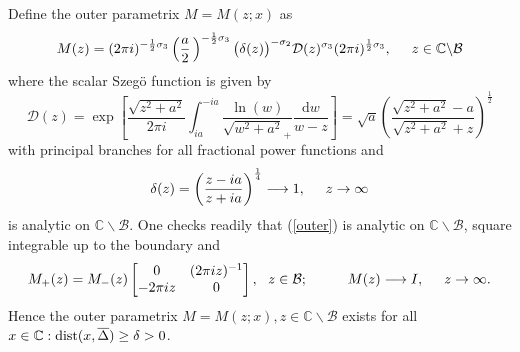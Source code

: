 \documentclass[10pt,oneside,reqno]{amsart}
\numberwithin{equation}{section}
\renewcommand{\d}{{\mathrm d}}
\def\eqref#1{(\ref{#1})}
\begin{document}
Define the outer parametrix $M=M(z;x)$ as
\begin{equation}\label{outer}
  M(z) = (2\pi i)^{-\frac{1}{2}\sigma_3}\left(\frac{a}{2}\,\right)^{-\frac{1}{2}\sigma_3}\big(\delta(z)\big)^{-\sigma_2}\mathcal{D}(z)^{\sigma_3}(2\pi i)^{\frac{1}{2}\sigma_3},\hspace{0.5cm}z\in\mathbb{C}\backslash\mathcal{B}
\end{equation}
where the scalar Szeg\"o function is given by
\begin{equation*}
  \mathcal{D}(z) = \exp\left[\frac{\sqrt{z^2+a^2}}{2\pi i}\int_{ia}^{-ia}\frac{\ln(w)}{\sqrt{w^2+a^2}_+}\frac{\d w}{w-z}\right]=\sqrt{a}
\left(\frac{\sqrt{z^2+a^2}-a}{\sqrt{z^2+a^2}+z}\right)^{\frac{1}{2}}
\end{equation*}
with principal branches for all fractional power functions and
\begin{equation*}
  \delta(z) = \left(\frac{z-ia}{z+ia}\right)^{\frac{1}{4}}\longrightarrow 1,\hspace{0.5cm}z\rightarrow\infty
\end{equation*}
is analytic on $\mathbb{C}\backslash\mathcal{B}$. One checks readily that \eqref{outer} is analytic on $\mathbb{C}\backslash\mathcal{B}$, square integrable up to the boundary and
\begin{equation*}
  M_+(z)=M_-(z)\begin{bmatrix}
                            0 & (2\pi iz)^{-1}\\
-2\pi iz& 0
                           \end{bmatrix},\ \ z\in\mathcal{B};\hspace{1cm}M(z)\longrightarrow I,\hspace{0.5cm}z\rightarrow\infty.
\end{equation*}
Hence the outer parametrix $M=M(z;x),z\in\mathbb{C}\backslash\mathcal{B}$ exists for all $x\in\mathbb{C}:\textnormal{dist}(x,\overline{\Delta})\geq\delta>0$.\bigskip
\end{document}
